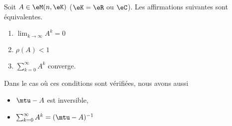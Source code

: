 \begin{theorem}   \label{THOooMNLGooKETwhh}
    Soit \( A\in \eM(n,\eK)\) (\( \eK=\eR\) ou \( \eC\)). Les affirmations suivantes sont équivalentes.
    \begin{enumerate}
        \item       \label{ITEMooCGLSooZsMXSt}
            \( \lim_{k\to \infty} A^k=0\)
        \item       \label{ITEMooYBGEooXAzVbD}
            \( \rho(A)<1\)
        \item       \label{ITEMooEJSQooTqkBbo}
            \( \sum_{k=0}^{\infty}A^k\) converge.
    \end{enumerate}
    Dans le cas où ces conditions sont vérifiées, nous avons aussi
    \begin{itemize}
        \item \( \mtu-A\) est inversible,
        \item
        \(\sum_{k=0}^{\infty}A^k=(\mtu - A)^{-1}\)
    \end{itemize}
\end{theorem}

